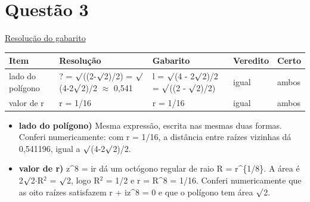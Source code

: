 \documentclass{article}%
\begin{document}
\section*{Questão 3}%
\href{https://poliedroresolve.sistemapoliedro.com.br/vestibulares/ita/2027/ita-2-fase-dia-1-20-10-2026-2-fase-dia-1/dissertativa-3-matematica-2-fase-dia-1-ita-2027}{Resolução do gabarito}\par\smallskip%
\begin{longtable}{@{}p{} p{} p{} p{} p{}@{}}\toprule Item & Resolução & Gabarito & Veredito & Certo \\ \midrule
lado do polígono & ? = $\surd$((2-$\surd$2)/2) = $\surd$(4-2$\surd$2)/2 $\approx$ 0,541 & l = $\surd$(4 - 2$\surd$2)/2 = $\surd$((2 - $\surd$2)/2) & igual & ambos \\
valor de r & r = 1/16 & r = 1/16 & igual & ambos \\
\bottomrule\end{longtable}%
\begin{itemize}%
\item%
\textbf{lado do polígono)} Mesma expressão, escrita nas mesmas duas formas. Conferi numericamente: com r = 1/16, a distância entre raízes vizinhas dá 0,541196, igual a $\surd$(4-2$\surd$2)/2.%
\item%
\textbf{valor de r)} z\^{}8 = ir dá um octógono regular de raio R = r\^{}\{1/8\}. A área é 2$\surd$2$\cdot$R$^2$ = $\surd$2, logo R$^2$ = 1/2 e r = R\^{}8 = 1/16. Conferi numericamente que as oito raízes satisfazem r + iz\^{}8 = 0 e que o polígono tem área $\surd$2.%
\end{itemize}%
\end{document}
